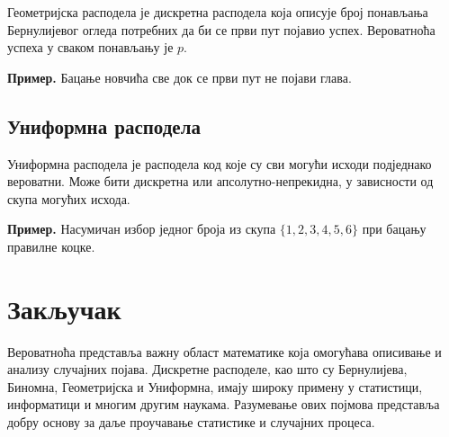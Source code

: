\documentclass[12pt]{article}
\theoremstyle{definition}
\begin{document}
Геометријска расподела је дискретна расподела која описује број понављања Бернулијевог огледа потребних да би се први пут појавио успех.
Вероватноћа успеха у сваком понављању је $p$.

\textbf{Пример.} Бацање новчића све док се први пут не појави глава.
\subsection{Униформна расподела}

Униформна расподела је расподела код које су сви могући исходи подједнако вероватни.
Може бити дискретна или апсолутно-непрекидна, у зависности од скупа могућих исхода.

\textbf{Пример.} Насумичан избор једног броја из скупа $\{1,2,3,4,5,6\}$ при бацању правилне коцке.


\section{Закључак}
Вероватноћа представља важну област математике која омогућава описивање и анализу случајних појава. Дискретне расподеле, као што су Бернулијева, Биномна, Геометријска и Униформна, имају широку примену у статистици, информатици и многим другим наукама. Разумевање ових појмова представља добру основу за даље проучавање статистике и случајних процеса.
\end{document}
